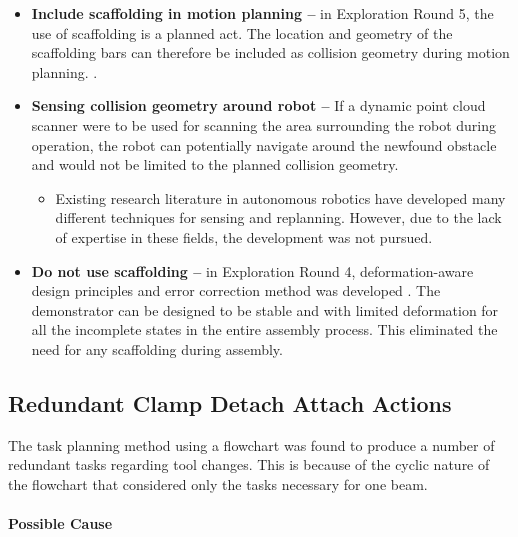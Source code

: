 \begin{itemize}
	\item \textbf{Include scaffolding in motion planning --} in Exploration Round 5, the use of scaffolding is a planned act. The location and geometry of the scaffolding bars can therefore be included as collision geometry during motion planning. .

	\item \textbf{Sensing collision geometry around robot --} If a dynamic point cloud scanner were to be used for scanning the area surrounding the robot during operation, the robot can potentially navigate around the newfound obstacle and would not be limited to the planned collision geometry. 

\begin{itemize}
	\item Existing research literature in autonomous robotics have developed many different techniques for sensing and replanning. \parencite{elbanhawiSamplingBasedRobotMotion2014} However, due to the lack of expertise in these fields, the development was not pursued.

\end{itemize}
	\item \textbf{Do not use scaffolding --} in Exploration Round 4, deformation-aware design principles and error correction method was developed . The demonstrator can be designed to be stable and with limited deformation for all the incomplete states in the entire assembly process. This eliminated the need for any scaffolding during assembly. 

\end{itemize}

\subsection{Redundant Clamp Detach Attach Actions}
\label{subsection:exploration-3-redundant-clamp-detach-attach-actions}

The task planning method using a flowchart was found to produce a number of redundant tasks regarding tool changes. This is because of the cyclic nature of the flowchart that considered only the tasks necessary for one beam. 

\paragraph{Possible Cause}

